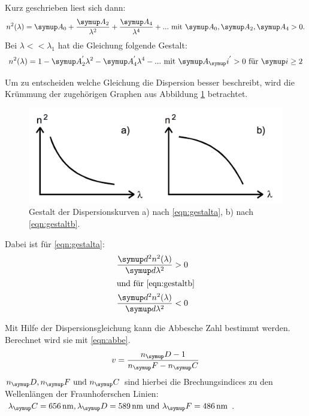 Kurz geschrieben liest sich dann:
\begin{equation}
  n^2(\lambda) = \g{A}_0 + \frac{\g{A_2}}{\lambda^2} + \frac{\g{A_4}}{\lambda^4} + ...
  \text{~mit~} \g{A}_0, \g{A}_2, \g{A}_4 > 0.
  \label{eqn:gestalta}
\end{equation}
Bei $\lambda << \lambda_1$ hat die Gleichung folgende Gestalt:
\begin{equation}
  n^2(\lambda) = 1- \g{A}_2^{'} \lambda^2 - \g{A}_4^{'} \lambda^4 - ...
  \text{~mit~} \g{A}_\g{i}^{'} > 0 \text{~für~} \g{i} \geq 2
  \label{eqn:gestaltb}
\end{equation}

Um zu entscheiden welche Gleichung die Dispersion besser beschreibt, wird
die Krümmung der zugehörigen Graphen aus Abbildung \ref{fig:Dispersionskurven}
betrachtet.
\begin{figure}
  \centering
  \includegraphics[width = \textwidth]{Pics/Dispersionskurven.pdf}
  \caption{Gestalt der Dispersionskurven a) nach \eqref{eqn:gestalta}, b) nach \eqref{eqn:gestaltb}.}
  \label{fig:Dispersionskurven}
\end{figure}
Dabei ist für \eqref{eqn:gestalta}:
\begin{align*}
  \frac{\g{d}^2 n^2(\lambda)}{\g{d} \lambda^2} &> 0\\
  \intertext{und für \eqref{eqn:gestaltb}}
  \frac{\g{d}^2 n^2(\lambda)}{\g{d} \lambda^2} &< 0
\end{align*}

Mit Hilfe der Dispersionsgleichung kann die Abbesche Zahl bestimmt werden.
Berechnet wird sie mit \eqref{eqn:abbe}.
\begin{equation}
  v = \frac{n_\g{D} -1 }{n_\g{F} - n_\g{C}}
  \label{eqn:abbe}
\end{equation}
$n_\g{D}, n_\g{F} \text{~und~} n_\g{C}$ sind hierbei die Brechungsindices zu den
Wellenlängen der Fraunhoferschen Linien: $\lambda_\g{C} = \SI{656}{\nano\meter},
\lambda_\g{D} = \SI{589}{\nano\meter} \text{~und~} \lambda_\g{F} = \SI{486}{\nano\meter}$.


